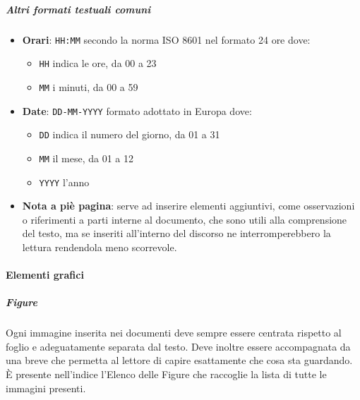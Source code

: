 			\subparagraph{Altri formati testuali comuni} \label{PS:Documentazione:Design:NormeT:AltriFormati}
			\begin{itemize}
				\item \textbf{Orari}: \texttt{HH:MM} secondo la norma ISO 8601 nel formato 24 ore dove:
				\begin{itemize}
					\item \texttt{HH} indica le ore, da 00 a 23
					\item \texttt{MM} i minuti, da 00 a 59
				\end{itemize}
				\item \textbf{Date}: \texttt{DD-MM-YYYY} formato adottato in Europa dove:
				\begin{itemize}
					\item \texttt{DD} indica il numero del giorno, da 01 a 31
					\item \texttt{MM} il mese, da 01 a 12
					\item \texttt{YYYY} l'anno
				\end{itemize}
				\item \textbf{Nota a piè pagina}: serve ad inserire elementi aggiuntivi, come osservazioni o riferimenti a parti interne al documento,
				che sono utili alla comprensione del testo, ma se inseriti all'interno del discorso ne interromperebbero la lettura rendendola meno scorrevole.
			\end{itemize}


			\paragraph{Elementi grafici}

			\subparagraph{Figure}
			Ogni immagine inserita nei documenti deve sempre essere centrata rispetto al foglio e adeguatamente separata dal testo. Deve inoltre essere
			accompagnata da una breve  che permetta al lettore di capire esattamente che cosa sta guardando. È presente nell'indice l'Elenco
			delle Figure che raccoglie la lista di tutte le immagini presenti.

